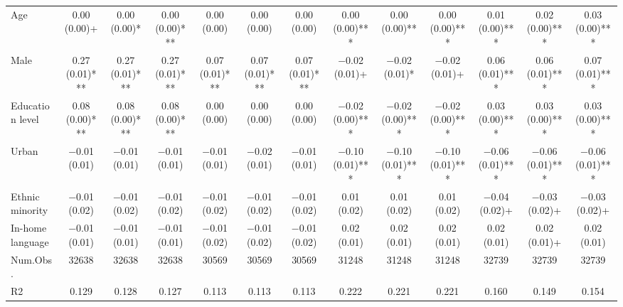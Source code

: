 \begin{table}[H]
\begin{tabular}[t]{lcccccccccccc}
Age & \num{0.00} (\num{0.00})+ & \num{0.00} (\num{0.00})* & \num{0.00} (\num{0.00})*** & \num{0.00} (\num{0.00}) & \num{0.00} (\num{0.00}) & \num{0.00} (\num{0.00}) & \num{0.00} (\num{0.00})*** & \num{0.00} (\num{0.00})** & \num{0.00} (\num{0.00})*** & \num{0.01} (\num{0.00})*** & \num{0.02} (\num{0.00})*** & \num{0.03} (\num{0.00})***\\
Male & \num{0.27} (\num{0.01})*** & \num{0.27} (\num{0.01})*** & \num{0.27} (\num{0.01})*** & \num{0.07} (\num{0.01})*** & \num{0.07} (\num{0.01})*** & \num{0.07} (\num{0.01})*** & \num{-0.02} (\num{0.01})+ & \num{-0.02} (\num{0.01})* & \num{-0.02} (\num{0.01})+ & \num{0.06} (\num{0.01})*** & \num{0.06} (\num{0.01})*** & \num{0.07} (\num{0.01})***\\
Education level & \num{0.08} (\num{0.00})*** & \num{0.08} (\num{0.00})*** & \num{0.08} (\num{0.00})*** & \num{0.00} (\num{0.00}) & \num{0.00} (\num{0.00}) & \num{0.00} (\num{0.00}) & \num{-0.02} (\num{0.00})*** & \num{-0.02} (\num{0.00})*** & \num{-0.02} (\num{0.00})*** & \num{0.03} (\num{0.00})*** & \num{0.03} (\num{0.00})*** & \num{0.03} (\num{0.00})***\\
Urban & \num{-0.01} (\num{0.01}) & \num{-0.01} (\num{0.01}) & \num{-0.01} (\num{0.01}) & \num{-0.01} (\num{0.01}) & \num{-0.02} (\num{0.01}) & \num{-0.01} (\num{0.01}) & \num{-0.10} (\num{0.01})*** & \num{-0.10} (\num{0.01})*** & \num{-0.10} (\num{0.01})*** & \num{-0.06} (\num{0.01})*** & \num{-0.06} (\num{0.01})*** & \num{-0.06} (\num{0.01})***\\
Ethnic minority & \num{-0.01} (\num{0.02}) & \num{-0.01} (\num{0.02}) & \num{-0.01} (\num{0.02}) & \num{-0.01} (\num{0.02}) & \num{-0.01} (\num{0.02}) & \num{-0.01} (\num{0.02}) & \num{0.01} (\num{0.02}) & \num{0.01} (\num{0.02}) & \num{0.01} (\num{0.02}) & \num{-0.04} (\num{0.02})+ & \num{-0.03} (\num{0.02})+ & \num{-0.03} (\num{0.02})+\\
In-home language & \num{-0.01} (\num{0.01}) & \num{-0.01} (\num{0.01}) & \num{-0.01} (\num{0.01}) & \num{-0.01} (\num{0.02}) & \num{-0.01} (\num{0.02}) & \num{-0.01} (\num{0.02}) & \num{0.02} (\num{0.01}) & \num{0.02} (\num{0.01}) & \num{0.02} (\num{0.01}) & \num{0.02} (\num{0.01}) & \num{0.02} (\num{0.01})+ & \num{0.02} (\num{0.01})\\
\midrule
Num.Obs. & \num{32638} & \num{32638} & \num{32638} & \num{30569} & \num{30569} & \num{30569} & \num{31248} & \num{31248} & \num{31248} & \num{32739} & \num{32739} & \num{32739}\\
R2 & \num{0.129} & \num{0.128} & \num{0.127} & \num{0.113} & \num{0.113} & \num{0.113} & \num{0.222} & \num{0.221} & \num{0.221} & \num{0.160} & \num{0.149} & \num{0.154}\\

\end{tabular}
\end{table}

